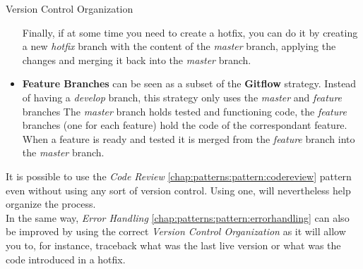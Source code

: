 \begin{pattern}{Version Control Organization}
\begin{itemize}
            Finally, if at some time you need to create a hotfix, you can do it by creating a new \textit{hotfix} branch with the content of the \textit{master} branch, applying the changes and merging it back into the \textit{master} branch.

            \item \textbf{Feature Branches} can be seen as a subset of the \textbf{Gitflow} strategy. Instead of having a \textit{develop} branch, this strategy only uses the \textit{master} and \textit{feature} branches The \textit{master} branch holds tested and functioning code, the \textit{feature} branches (one for each feature) hold the code of the correspondant feature. When a feature is ready and tested it is merged from the \textit{feature} branch into the \textit{master} branch.
        \end{itemize}

    \related
    It is possible to use the \textit{Code Review} \ref{chap:patterns:pattern:codereview} pattern even without using any sort of version control. Using one, will nevertheless help organize the process.\\
    In the same way, \textit{Error Handling} \ref{chap:patterns:pattern:errorhandling} can also be improved by using the correct \textit{Version Control Organization} as it will allow you to, for instance, traceback what was the last live version or what was the code introduced in a hotfix.
\end{pattern}












